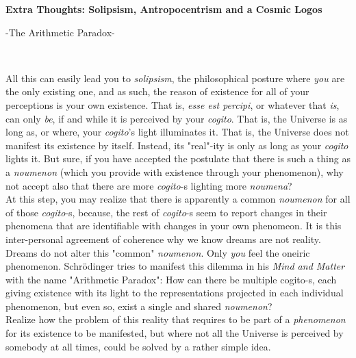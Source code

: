 \documentclass[11pt, a4paper]{article} %
\DeclareRobustCommand{\mybox}[2][gray!10]{%
\begin{tcolorbox}[   %
        left=0.2cm,
        right=0.2cm,
        top=0.15cm,
        bottom=0.15cm,
        colback=#1,
        colframe=#1,
        width=\dimexpr\textwidth\relax, 
        enlarge left by=0mm,
        boxsep=5pt,
        arc=0pt,outer arc=0pt,
        ]
        #2
\end{tcolorbox}
}
\begin{document}
\mybox{ {\bf Extra Thoughts: Solipsism, Antropocentrism and a Cosmic Logos \\ \centerline{-The Arithmetic Paradox-} \vspace{-0.2cm}  \\ }
All this can easily lead you to {\em solipsism}, the philosophical posture where {\em you} are the only existing one, and as such, the reason of existence for all of your perceptions is your own existence. That is, {\em esse est percipi}, or whatever that {\em is}, can only {\em be}, if and while it is perceived by your {\em cogito}. That is, the Universe is as long as, or where, your {\em cogito}'s light illuminates it. That is, the Universe does not manifest its existence by itself. Instead, its "real"-ity is only as long as your {\em cogito} lights it. But sure, if you have accepted the postulate that there is such a thing as a {\em noumenon} (which you provide with existence through your phenomenon), why not accept also that there are more {\em cogito}-s lighting more {\em noumena}?\vspace{-0.2cm}  \\

At this step, you may realize that there is apparently a common {\em noumenon} for all of those {\em cogito}-s, because, the rest of {\em cogito}-s seem to report changes in their phenomena that are identifiable with changes in your own phenomeon. It is this inter-personal agreement of coherence why we know dreams are not reality. Dreams do not alter this "common" {\em noumenon}. Only {\em you} feel the oneiric phenomenon. Schrödinger tries to manifest this dilemma in his {\em Mind and Matter} with the name "Arithmetic Paradox": How can there be multiple cogito-s, each giving existence with its light to the representations projected in each individual phenomenon, but even so, exist a single and shared {\em noumenon}?\vspace{-0.2cm} \\

Realize how the problem of this reality that requires to be part of a {\em phenomenon} for its existence to be manifested, but where not all the Universe is perceived by somebody at all times, could be solved by a rather simple idea.}
\end{document}
